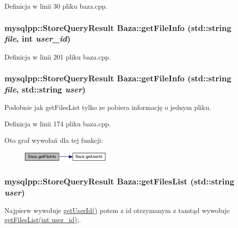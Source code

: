 Definicja w linii 30 pliku baza.cpp.\hypertarget{a00001_1d1cfca062ab3117b2b97281df012823}{
\subsubsection[{getFileInfo}]{\setlength{\rightskip}{0pt plus 5cm}mysqlpp::StoreQueryResult Baza::getFileInfo (std::string {\em file}, \/  int {\em user\_\-id})}}
\label{d8/d84/a00001_1d1cfca062ab3117b2b97281df012823}




Definicja w linii 201 pliku baza.cpp.\hypertarget{a00001_e4a033a65cb585aa91c15fd8b8fde764}{
\subsubsection[{getFileInfo}]{\setlength{\rightskip}{0pt plus 5cm}mysqlpp::StoreQueryResult Baza::getFileInfo (std::string {\em file}, \/  std::string {\em user})}}
\label{d8/d84/a00001_e4a033a65cb585aa91c15fd8b8fde764}


Podobnie jak getFilesList tylko ze pobiera informację o jednym pliku. 



Definicja w linii 174 pliku baza.cpp.

Oto graf wywołań dla tej funkcji:\nopagebreak
\begin{figure}[H]
\begin{center}
\leavevmode
\includegraphics[width=129pt]{d8/d84/a00001_e4a033a65cb585aa91c15fd8b8fde764_cgraph}
\end{center}
\end{figure}
\hypertarget{a00001_2eace36725672b3a4ce639f91fe7d9bd}{
\subsubsection[{getFilesList}]{\setlength{\rightskip}{0pt plus 5cm}mysqlpp::StoreQueryResult Baza::getFilesList (std::string {\em user})}}
\label{d8/d84/a00001_2eace36725672b3a4ce639f91fe7d9bd}


Najpierw wywołuje \hyperlink{a00001_65054f08c8fd7c600f6c2fe2c7f61a43}{getUserId()} potem z id otrzymanym z tamtąd wywołuje \hyperlink{a00001_02db3388d088212bd443ee39998b5cf8}{getFilesList(int user\_\-id)};. 

